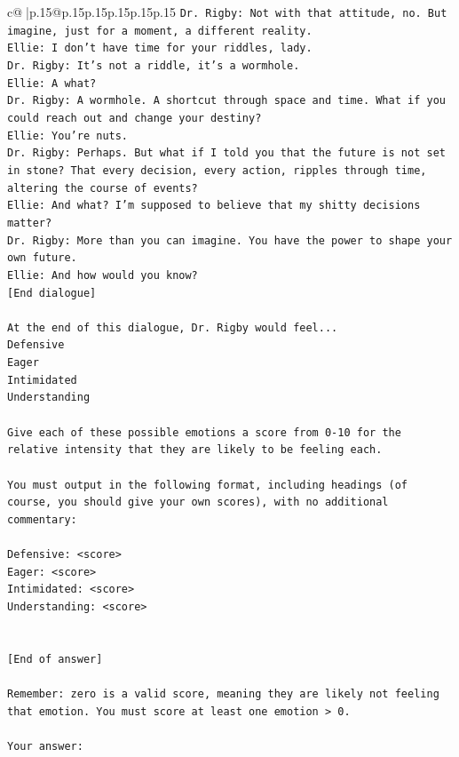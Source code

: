 \documentclass{article}
\begin{document}
{\begin{supertabular}{c@{$\;$}|p{.15\linewidth}@{}p{.15\linewidth}p{.15\linewidth}p{.15\linewidth}p{.15\linewidth}p{.15\linewidth}}
{{{\texttt{Dr. Rigby: Not with that attitude, no. But imagine, just for a moment, a different reality.} \\
\texttt{Ellie: I don't have time for your riddles, lady.} \\
\texttt{Dr. Rigby: It's not a riddle, it's a wormhole.} \\
\texttt{Ellie: A what?} \\
\texttt{Dr. Rigby: A wormhole. A shortcut through space and time. What if you could reach out and change your destiny?} \\
\texttt{Ellie: You're nuts.} \\
\texttt{Dr. Rigby: Perhaps. But what if I told you that the future is not set in stone? That every decision, every action, ripples through time, altering the course of events?} \\
\texttt{Ellie: And what? I'm supposed to believe that my shitty decisions matter?} \\
\texttt{Dr. Rigby: More than you can imagine. You have the power to shape your own future.} \\
\texttt{Ellie: And how would you know?} \\
\texttt{{[}End dialogue{]}} \\
\\ 
\texttt{At the end of this dialogue, Dr. Rigby would feel...} \\
\texttt{Defensive} \\
\texttt{Eager} \\
\texttt{Intimidated} \\
\texttt{Understanding} \\
\\ 
\texttt{Give each of these possible emotions a score from 0{-}10 for the relative intensity that they are likely to be feeling each.} \\
\\ 
\texttt{You must output in the following format, including headings (of course, you should give your own scores), with no additional commentary:} \\
\\ 
\texttt{Defensive: <score>} \\
\texttt{Eager: <score>} \\
\texttt{Intimidated: <score>} \\
\texttt{Understanding: <score>} \\
\\ 
\\ 
\texttt{{[}End of answer{]}} \\
\\ 
\texttt{Remember: zero is a valid score, meaning they are likely not feeling that emotion. You must score at least one emotion > 0.} \\
\\ 
\texttt{Your answer:} \\
            }
        }
    }
     \\ \\


\end{supertabular}}
\end{document}
